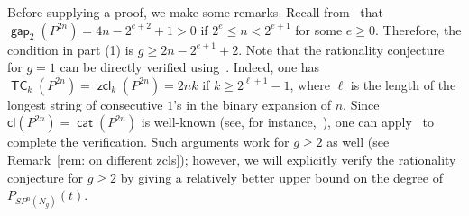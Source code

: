 \documentclass[amscd,amssymb,verbatim,10pt]{amsart}
\numberwithin{equation}{section}
\theoremstyle{plain}
\theoremstyle{definition}
\DeclareMathOperator{\cat}{{\mathsf{cat}}}
\DeclareMathOperator{\TC}{{\mathsf{TC}}}
\DeclareMathOperator{\zcl}{{\mathsf{zcl}}}
\DeclareMathOperator{\gap}{{\mathsf{gap}}}
\begin{document}
Before supplying a proof, we make some remarks. Recall from~\cite{CAG+} that $\gap_2(P^{2n})=4n-2^{e+2}+1>0$ if $2^e\le n <2^{e+1}$ for some $e\ge 0$. Therefore, the condition in part (1) is $g\ge 2n-2^{e+1}+2$. Note that the rationality conjecture for $g=1$ can be directly verified using~\cite[Proposition 1.4]{Dav}. Indeed, one has $\TC_k(P^{2n})=\zcl_k(P^{2n})= 2nk$ if $k\ge 2^{\ell+1}-1$, where $\ell$ is the length of the longest string of consecutive $1$’s in the binary expansion of $n$. Since $\mathsf{cl}(P^{2n})=\cat(P^{2n})$ is well-known (see, for instance,~\cite{CLOT}), one can apply~\cite[Theorem~1]{FKS} to complete the verification. Such arguments work for $g\ge 2$ as well (see Remark~\ref{rem: on different zcls}); however, we will explicitly verify the rationality conjecture for $g\ge 2$ by giving a relatively better upper bound on the degree of $P_{SP^n(N_g)}(t)$.
\end{document}
